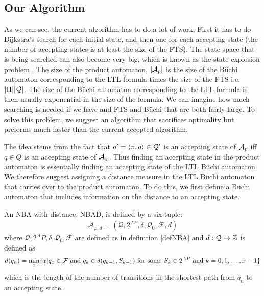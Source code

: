 \subsection{Our Algorithm}
As we can see, the current algorithm has to do a lot of work. First it has to do Dijkstra's search for each initial state, and then one for each accepting state (the number of accepting states is at least the size of the FTS). The state space that is being searched can also become very big, which is known as the state explosion problem \cite{clarke99}. The size of the product automaton, $|\mathcal{A}_p|$ is the size of the B\"{u}chi automaton corresponding to the LTL formula times the size of the FTS i.e.\ $|\Pi| \dot |\mathcal{Q}|$. The size of the B\"{u}chi automaton corresponding to the LTL formula is then usually exponential in the size of the formula. We can imagine how much searching is needed if we have and FTS and B\"{u}chi that are both fairly large. To solve this problem, we suggest an algorithm that sacrifices optimality but preforms much faster than the current accepted algorithm. 

The idea stems from the fact that $q' = \langle \pi, q \rangle \in \mathcal{Q}'$ is an accepting state of $\mathcal{A}_p$ iff $q \in Q$ is an accepting state of $\mathcal{A}_\varphi$. Thus finding an accepting state in the product automaton is essentially finding an accepting state of the LTL B\"{u}chi automaton. We therefore suggest assigning a distance measure in the LTL B\"{u}chi automaton that carries over to the product automaton. To do this, we first define a B\"{u}chi automaton that includes information on the distance to an accepting state.

\begin{definition}
\label{defBWD}
An NBA with distance, NBAD, is defined by a six-tuple:
\begin{align*}
\mathcal{A}_{\varphi,d} = (\mathcal{Q},2^{AP},\delta,\mathcal{Q}_0,\mathcal{F},d)
\end{align*}
where $\mathcal{Q},2^AP,\delta,\mathcal{Q}_0,\mathcal{F}$ are defined as in definition \ref{defNBA} and $d:\mathcal{Q} \rightarrow \mathbb{Z}$ is defined as 
\begin{align*}
d(q_n) = \min_x \{x | q_x \in \mathcal{F} \text{ and } q_k \in \delta(q_{k-1},S_{k-1}) \text{ for some } S_k \in 2^{AP} \text{ and } k = 0,1,\dots, x-1 \}
\end{align*}
which is the length of the number of transitions in the shortest path from $q_n$ to an accepting state.
\end{definition}

